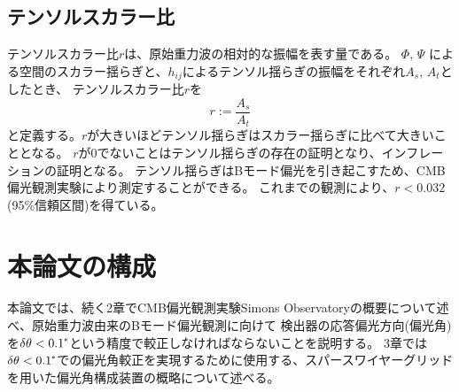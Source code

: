 \documentclass[../../main.tex]{subfiles}
\begin{document}
\subsection{テンソルスカラー比}
テンソルスカラー比$r$は、原始重力波の相対的な振幅を表す量である。
$\Phi,\,\Psi$ による空間のスカラー揺らぎと、$h_{ij}$によるテンソル揺らぎの振幅をそれぞれ$A_{s},\,A_{t}$としたとき、
テンソルスカラー比$r$を
\begin{equation}
    r := \dfrac{A_s}{A_t}
\end{equation}
と定義する。$r$が大きいほどテンソル揺らぎはスカラー揺らぎに比べて大きいこととなる。
$r$が0でないことはテンソル揺らぎの存在の証明となり、インフレーションの証明となる。
テンソル揺らぎはBモード偏光を引き起こすため、CMB偏光観測実験により測定することができる。
これまでの観測により、$r<0.032$(95\%信頼区間)を得ている\cite{}。


\section{本論文の構成}
本論文では、続く2章でCMB偏光観測実験Simons Observatoryの概要について述べ、原始重力波由来のBモード偏光観測に向けて
検出器の応答偏光方向(偏光角)を$\delta\theta < 0.1\tcdegree$という精度で較正しなければならないことを説明する。
3章では$\delta\theta<0.1\tcdegree$での偏光角較正を実現するために使用する、スパースワイヤーグリッドを用いた偏光角構成装置の概略について述べる。
\end{document}
